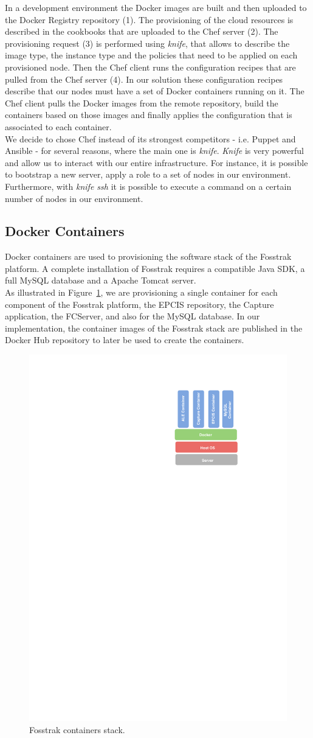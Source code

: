 In a development environment the Docker images are built and then uploaded to the Docker Registry
repository (1). The provisioning of the cloud resources is described in the cookbooks that are uploaded
to the Chef server (2). The provisioning request (3) is performed using \textit{knife}, that allows to
describe the image type, the instance type and the policies that need to be applied on each provisioned node.
Then the Chef client runs the configuration recipes that are pulled from the Chef server (4). In our
solution these configuration recipes describe that our nodes must have a set of Docker containers
running on it. The Chef client pulls the Docker images from the remote repository, build the containers
based on those images and finally applies the configuration that is associated to each container.\\

We decide to chose Chef instead of its strongest competitors - i.e. Puppet and Ansible - for several
reasons, where the main one is \textit{knife}. \textit{Knife} is very powerful and allow us to
interact with our entire infrastructure. For instance, it is possible to bootstrap a new server,
apply a role to a set of nodes in our environment. Furthermore, with \textit{knife ssh} it is
possible to execute a command on a certain number of nodes in our environment.

\subsection{Docker Containers}
\label{sub:impl_docker}
Docker containers are used to provisioning the software stack of the Fosstrak platform. A complete
installation of Fosstrak requires a compatible Java \gls{SDK}, a full MySQL database and a Apache Tomcat
server.\\

As illustrated in Figure~\ref{fig:impl_containers}, we are provisioning a single container for each
component of the Fosstrak platform, the \gls{EPCIS} repository, the Capture application, the \gls{FCServer},
and also for the MySQL database. In our implementation, the container images of the Fosstrak stack
are published in the Docker Hub repository to later be used to create the containers.\\

\begin{figure}[!ht]
  \centering
  \includegraphics[width=.3\textwidth]{./images/docker-stack}
  \caption{Fosstrak containers stack.}
  \label{fig:impl_containers}
\end{figure}


